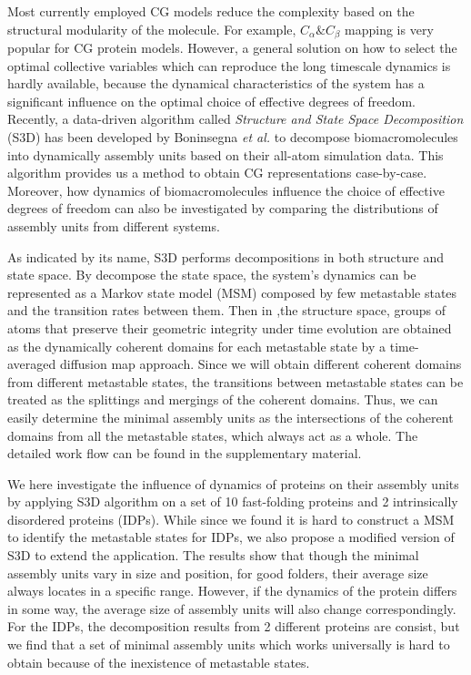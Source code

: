 \documentclass[journal=jacsat,manuscript=article]{achemso}
\begin{document}
Most currently employed CG models reduce the complexity based on the structural modularity of the molecule\cite{CG_model_review}. For example, $C_{\alpha}\&C_{\beta}$ mapping is very popular for CG protein models\cite{structure_based_model,SMOG}. However, a general solution on how to select the optimal collective variables which can reproduce the long timescale dynamics is hardly available, because the dynamical characteristics of the system has a significant influence on the optimal choice of effective degrees of freedom. Recently, a data-driven algorithm called {\it Structure and State Space Decomposition} (S3D) has been developed by Boninsegna {\it et al.} to decompose biomacromolecules into dynamically assembly units based on their all-atom simulation data\cite{Lrenzo_S3D}. This algorithm provides us a method to obtain CG representations case-by-case. Moreover, how dynamics of biomacromolecules influence the choice of effective degrees of freedom can also be investigated by comparing the distributions of assembly units from different systems.

As indicated by its name, S3D performs decompositions in both structure and state space. By decompose the state space, the system's dynamics can be represented as a Markov state model (MSM) composed by few metastable states and the transition rates between them\cite{TICA,TICA_commute_map,TICA_collective_variable,MSM,HMM}. Then in ,the structure space, groups of atoms that preserve their geometric integrity under time evolution are obtained as the dynamically coherent domains for each metastable state by a time-averaged diffusion map approach\cite{diffusion_map_clustering,diffusion_map}. Since we will obtain different coherent domains from different metastable states, the transitions between metastable states can be treated as the splittings and mergings of the coherent domains. Thus, we can easily determine the minimal assembly units as the intersections of the coherent domains from all the metastable states, which always act as a whole\cite{Lrenzo_S3D}. The detailed work flow can be found in the supplementary material.

We here investigate the influence of dynamics of proteins on their assembly units by applying S3D algorithm on a set of 10 fast-folding proteins\cite{DE_Shaw_fast-folding} and 2 intrinsically disordered proteins (IDPs)\cite{ACTR,MYC}. While since we found it is hard to construct a MSM to identify the metastable states for IDPs, we also propose a modified version of S3D to extend the application. The results show that though the minimal assembly units vary in size and position, for good folders, their average size always locates in a specific range. However, if the dynamics of the protein differs in some way, the average size of assembly units will also change correspondingly. For the IDPs, the decomposition results from 2 different proteins are consist, but we find that a set of minimal assembly units which works universally is hard to obtain because of the inexistence of metastable states.
\end{document}
